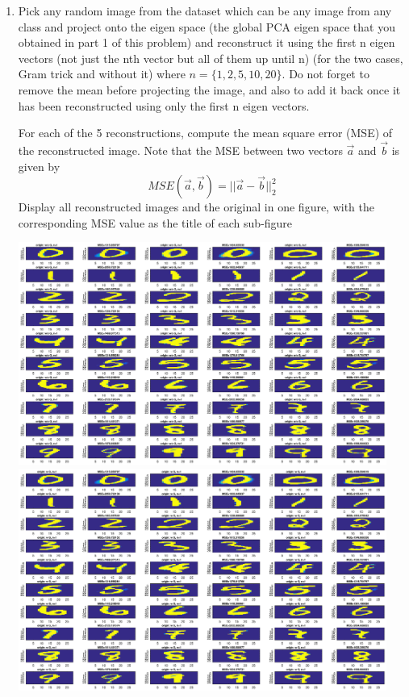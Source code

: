 \documentclass[letterpaper,10pt]{article}
\begin{document}
\begin{enumerate}
	\item  Pick any random image from the dataset which can be any image from any
	class and project onto the eigen space (the global PCA eigen space that
	you obtained in part 1 of this problem) and reconstruct it using the first n
	eigen vectors (not just the nth vector but all of them up until n) (for the
	two cases, Gram trick and without it) where $n = \{1, 2, 5, 10, 20\}$. Do not
	forget to remove the mean before projecting the image, and also to add it
	back once it has been reconstructed using only the first n eigen vectors.
	
	For each of the 5 reconstructions, compute the mean square error (MSE)
	of the reconstructed image. Note that the MSE between two vectors $\vec{a}$
	and $\vec{b}$ is given by
	$$MSE(\vec{a},\vec{b})=||\vec{a}-\vec{b}||_2^2$$
	Display all reconstructed images and the original in one figure, with the
	corresponding MSE value as the title of each sub-figure\\
	
	\newpage
	\begin{center}
	\includegraphics[width=0.95\textwidth]{./matlab/WoG_N01.eps}
	\includegraphics[width=0.95\textwidth]{./matlab/WG_N01.eps}

\end{center}
\end{enumerate}
\end{document}
